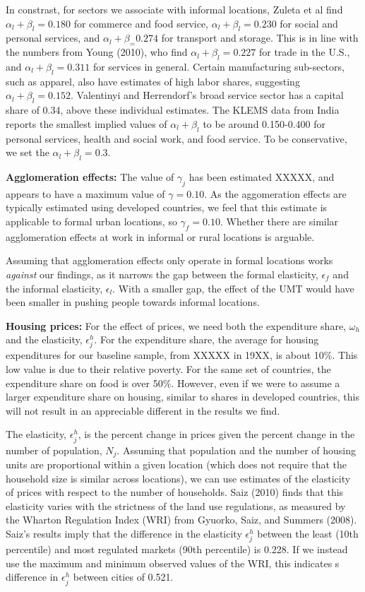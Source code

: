 \documentclass[10pt]{article}
\begin{document}
In constrast, for sectors we associate with informal locations, Zuleta et al find $\alpha_l + \beta_l = 0.180$ for commerce and food service, $\alpha_l + \beta_l = 0.230$ for social and personal services, and $\alpha_l + \beta_ = 0.274$ for transport and storage. This is in line with the numbers from Young (2010), who find $\alpha_l + \beta_l = 0.227$ for trade in the U.S., and $\alpha_l + \beta_l = 0.311$ for services in general. Certain manufacturing sub-sectors, such as apparel, also have estimates of high labor shares, suggesting $\alpha_l + \beta_l = 0.152$. Valentinyi and Herrendorf's broad service sector has a capital share of 0.34, above these individual estimates. The KLEMS data from India reports the smallest implied values of $\alpha_l+\beta_l$ to be around 0.150-0.400 for personal services, health and social work, and food service. To be conservative, we set the $\alpha_l + \beta_l = 0.3$.

\textbf{Agglomeration effects:} The value of $\gamma_j$ has been estimated XXXXX, and appears to have a maximum value of $\gamma = 0.10$. As the aggomeration effects are typically estimated using developed countries, we feel that this estimate is applicable to formal urban locations, so $\gamma_f = 0.10$. Whether there are similar agglomeration effects at work in informal or rural locations is arguable. 

Assuming that agglomeration effects only operate in formal locations works \textit{against} our findings, as it narrows the gap between the formal elasticity, $\epsilon_f$ and the informal elasticity, $\epsilon_l$. With a smaller gap, the effect of the UMT would have been smaller in pushing people towards informal locations. 

\textbf{Housing prices:} For the effect of prices, we need both the expenditure share, $\omega_h$ and the elasticity, $\epsilon^h_j$. For the expenditure share, the average for housing expenditures for our baseline sample, from XXXXX in 19XX, is about 10\%. This low value is due to their relative poverty. For the same set of countries, the expenditure share on food is over 50\%. However, even if we were to assume a larger expenditure share on housing, similar to shares in developed countries, this will not result in an appreciable different in the results we find.

The elasticity, $\epsilon^h_j$, is the percent change in prices given the percent change in the number of population, $N_j$. Assuming that population and the number of housing units are proportional within a given location (which does not require that the household size is similar across locations), we can use estimates of the elasticity of prices with respect to the number of households. Saiz (2010) finds that this elasticity varies with the strictness of the land use regulations, as measured by the Wharton Regulation Index (WRI) from Gyuorko, Saiz, and Summers (2008). Saiz's results imply that the difference in the elasticity $\epsilon^h_j$ between the least (10th percentile) and most regulated markets (90th percentile) is 0.228. If we instead use the maximum and minimum observed values of the WRI, this indicates s difference in $\epsilon^h_j$ between cities of 0.521. 
\end{document}
